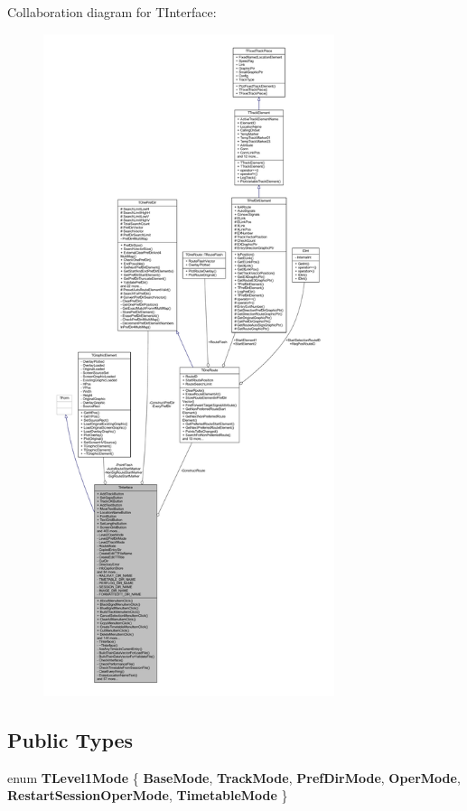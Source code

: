 Collaboration diagram for T\+Interface\+:
\nopagebreak
\begin{figure}[H]
\begin{center}
\leavevmode
\includegraphics[height=550pt]{class_t_interface__coll__graph}
\end{center}
\end{figure}
\subsection*{Public Types}
\begin{DoxyCompactItemize}
\item 
\mbox{\label{class_t_interface_afdd8ad9ea5529b9193c4b4c5ac683bc5}} 
enum {\bfseries T\+Level1\+Mode} \{ \newline
{\bfseries Base\+Mode}, 
{\bfseries Track\+Mode}, 
{\bfseries Pref\+Dir\+Mode}, 
{\bfseries Oper\+Mode}, 
\newline
{\bfseries Restart\+Session\+Oper\+Mode}, 
{\bfseries Timetable\+Mode}
 \}
\end{DoxyCompactItemize}

